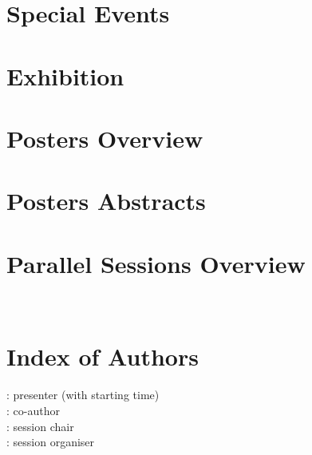 \documentclass[a4paper,twoside,twocolumn,9pt]{extbook}
\begin{document}
\chapter{Special Events}\label{plenaries_semiplenaries}
\clearpage
\chapter{Exhibition}%
\chapter{Posters Overview}\label{session:posters}
\chapter{Posters Abstracts}\label{session:postersabstracts}
\newpage
\onecolumn%
\newpage
{}
\newpage
\chapter{Parallel Sessions Overview}\label{parallel_sessions_overview}%
\ \\[4em]%
\restorecolumns%
\pagestyle{registerstyle}%
\cleardoublepage%
\chapter{Index of Authors}
\noindent%
			: presenter (with starting time)\\
		: co-author\\
\makebox[3.8em][r]{{\color{gray}[c]}}	: session chair\\
\makebox[3.8em][r]{{\color{gray}[o]}}	: session organiser\\

\listoftodos
\end{document}
